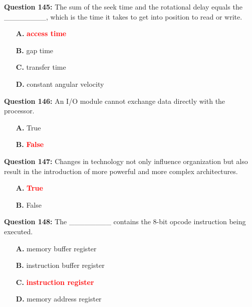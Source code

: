 \documentclass[12pt,a4paper]{article}
\begin{document}
\vspace{0.5cm}

\textbf{Question 145:} The sum of the seek time and the rotational delay equals the ________, which is the time it takes to get into position to read or write.

\begin{itemize}
    \item[\textbf{A.}] \textcolor{red}{\textbf{access time}}
    \item[\textbf{B.}] gap time
    \item[\textbf{C.}] transfer time
    \item[\textbf{D.}] constant angular velocity
\end{itemize}

\vspace{0.5cm}

\textbf{Question 146:} An I/O module cannot exchange data directly with the processor.

\begin{itemize}
    \item[\textbf{A.}] True
    \item[\textbf{B.}] \textcolor{red}{\textbf{False}}
\end{itemize}

\vspace{0.5cm}

\textbf{Question 147:} Changes in technology not only influence organization but also result in the introduction of more powerful and more complex architectures.

\begin{itemize}
    \item[\textbf{A.}] \textcolor{red}{\textbf{True}}
    \item[\textbf{B.}] False
\end{itemize}

\vspace{0.5cm}

\textbf{Question 148:} The ________ contains the 8-bit opcode instruction being executed.

\begin{itemize}
    \item[\textbf{A.}] memory buffer register
    \item[\textbf{B.}] instruction buffer register
    \item[\textbf{C.}] \textcolor{red}{\textbf{instruction register}}
    \item[\textbf{D.}] memory address register
\end{itemize}
\end{document}
